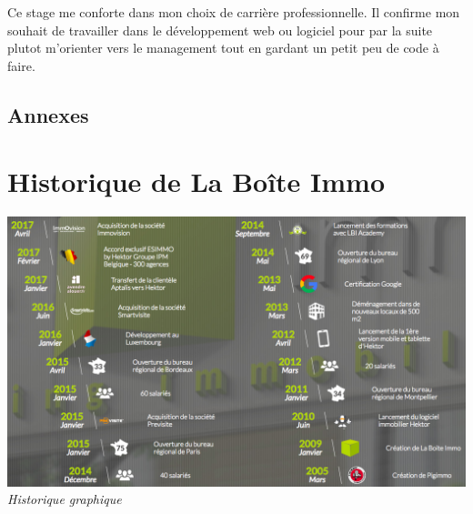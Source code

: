 \documentclass[12pt]{article}
\begin{document}
Ce stage me conforte dans mon choix de carrière professionnelle. Il confirme mon souhait de travailler dans le développement web ou logiciel pour par la suite plutot m'orienter vers le management tout en gardant un petit peu de code à faire.


\newpage

\begin{appendix}
\section{Annexes}
\chapter{Historique de La Boîte Immo}
    \begin{center}
        \includegraphics[width = 15cm]{historique.png}
        \textit{Historique graphique}
    \end{center} 


\end{appendix}
\end{document}

